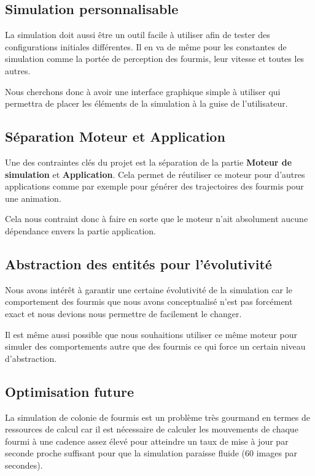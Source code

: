 \documentclass{EPUProjetDi}
\begin{document}
\subsection*{Simulation personnalisable}

La simulation doit aussi être un outil facile à utiliser afin de tester des configurations initiales différentes.
Il en va de même pour les constantes de simulation comme la portée de perception des fourmis, leur vitesse et toutes les autres.

Nous cherchons donc à avoir une interface graphique simple à utiliser qui permettra de placer les éléments de la simulation à la guise
de l'utilisateur.

\subsection*{Séparation Moteur et Application}

Une des contraintes clés du projet est la séparation de la partie \textbf{Moteur de simulation} et \textbf{Application}.
Cela permet de réutiliser ce moteur pour d'autres applications comme par exemple pour générer des trajectoires des fourmis 
pour une animation.

Cela nous contraint donc à faire en sorte que le moteur n'ait absolument aucune dépendance envers la partie application.

\subsection*{Abstraction des entités pour l'évolutivité}

Nous avons intérêt à garantir une certaine évolutivité de la simulation car le comportement des fourmis que nous avons conceptualisé
n'est pas forcément exact et nous devions nous permettre de facilement le changer.

Il est même aussi possible que nous souhaitions utiliser ce même moteur pour simuler des comportements autre que
des fourmis ce qui force un certain niveau d'abstraction.

\subsection*{Optimisation future}

La simulation de colonie de fourmis est un problème très gourmand en termes de ressources de calcul car il est nécessaire de calculer les mouvements
de chaque fourmi à une cadence assez élevé pour atteindre un taux de mise à jour par seconde proche suffisant pour que la simulation paraisse fluide 
(60 images par secondes).
\end{document}
